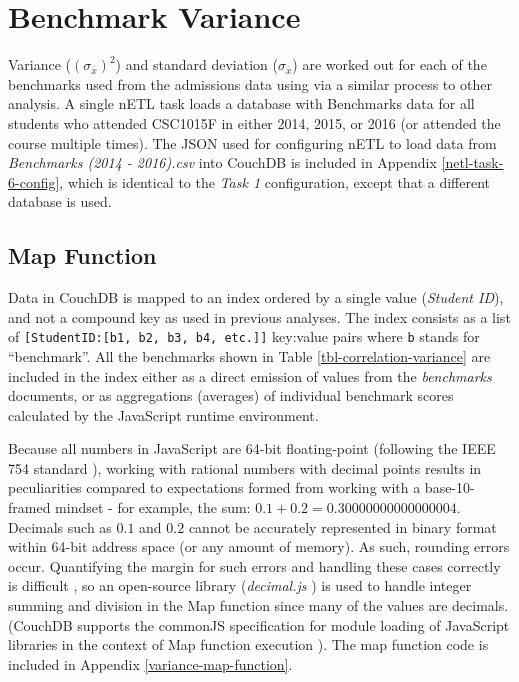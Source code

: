\section{Benchmark Variance}
Variance ($(\sigma_{\overline{x}})^{2}$) and standard deviation ($\sigma_{\overline{x}}$) are worked out for each of the benchmarks used from the admissions data using via a similar process to other analysis. A single nETL task loads a database with Benchmarks data for all students who attended CSC1015F in either 2014, 2015, or 2016 (or attended the course multiple times). The JSON used for configuring nETL to load data from \textit{Benchmarks (2014 - 2016).csv} into CouchDB is included in Appendix \ref{netl-task-6-config}, which is identical to the \textit{Task 1} configuration, except that a different database is used.

\subsection{Map Function}
Data in CouchDB is mapped to an index ordered by a single value (\textit{Student ID}), and not a compound key as used in previous analyses. The index consists as a list of \texttt{[StudentID:[b1, b2, b3, b4, etc.]]} key:value pairs where \texttt{b} stands for ``benchmark''. All the benchmarks shown in Table \ref{tbl-correlation-variance} are included in the index either as a direct emission of values from the \textit{benchmarks} documents, or as aggregations (averages) of individual benchmark scores calculated by the JavaScript runtime environment.

Because all numbers in JavaScript are 64-bit floating-point (following the IEEE 754 standard \cite{floatingPoint}), working with rational numbers with decimal points results in peculiarities compared to expectations formed from working with a base-10-framed mindset - for example, the sum: $0.1 + 0.2 = 0.30000000000000004$. Decimals such as $0.1$ and $0.2$ cannot be accurately represented in binary format within 64-bit address space (or any amount of memory). As such, rounding errors occur. Quantifying the margin for such errors and handling these cases correctly is difficult \cite{Goldberg1991}, so an open-source library (\textit{decimal.js} \cite{decimaljs}) is used to handle integer summing and division in the Map function since many of the values are decimals. (CouchDB supports the commonJS specification for module loading of JavaScript libraries in the context of Map function execution \cite{commonJsMapFn}). The map function code is included in Appendix \ref{variance-map-function}.

